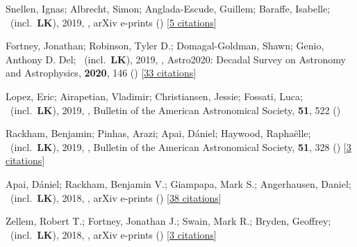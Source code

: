 \item[{\color{numcolor}\scriptsize8}] Snellen, Ignas; Albrecht, Simon; Anglada-Escude, Guillem; Baraffe, Isabelle; \etal\ (incl.\ \textbf{LK}), 2019, , arXiv e-prints () [\href{https://ui.adsabs.harvard.edu/abs/2019arXiv190801803S}{5 citations}]

\item[{\color{numcolor}\scriptsize7}] Fortney, Jonathan; Robinson, Tyler D.; Domagal-Goldman, Shawn; Genio, Anthony D. Del; \etal\ (incl.\ \textbf{LK}), 2019, , Astro2020: Decadal Survey on Astronomy and Astrophysics, \textbf{2020}, 146 () [\href{https://ui.adsabs.harvard.edu/abs/2019astro2020T.146F}{33 citations}]

\item[{\color{numcolor}\scriptsize6}] Lopez, Eric; Airapetian, Vladimir; Christiansen, Jessie; Fossati, Luca; \etal\ (incl.\ \textbf{LK}), 2019, , Bulletin of the American Astronomical Society, \textbf{51}, 522 ()

\item[{\color{numcolor}\scriptsize5}] Rackham, Benjamin; Pinhas, Arazi; Apai, D{\'a}niel; Haywood, Rapha{\"e}lle; \etal\ (incl.\ \textbf{LK}), 2019, , Bulletin of the American Astronomical Society, \textbf{51}, 328 () [\href{https://ui.adsabs.harvard.edu/abs/2019BAAS...51c.328R}{3 citations}]

\item[{\color{numcolor}\scriptsize4}] Apai, D{\'a}niel; Rackham, Benjamin V.; Giampapa, Mark S.; Angerhausen, Daniel; \etal\ (incl.\ \textbf{LK}), 2018, , arXiv e-prints () [\href{https://ui.adsabs.harvard.edu/abs/2018arXiv180308708A}{38 citations}]

\item[{\color{numcolor}\scriptsize3}] Zellem, Robert T.; Fortney, Jonathan J.; Swain, Mark R.; Bryden, Geoffrey; \etal\ (incl.\ \textbf{LK}), 2018, , arXiv e-prints () [\href{https://ui.adsabs.harvard.edu/abs/2018arXiv180307163Z}{3 citations}]

